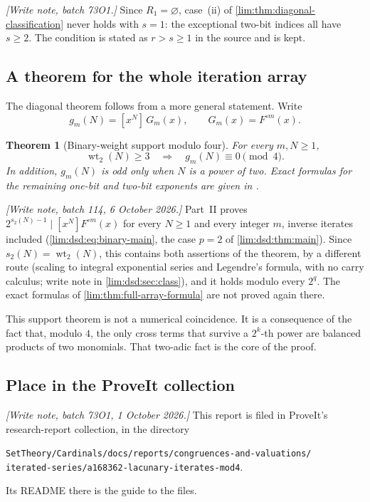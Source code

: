 \documentclass[11pt]{article}
\newtheorem{theorem}{Theorem}[section]
\theoremstyle{definition}
\theoremstyle{remark}
\newcommand{\coef}[2]{[x^{#1}]\,#2}
\newcommand{\wt}{\operatorname{wt}_2}
\begin{document}
\emph{[Write note, batch 73O1.]} Since $R_1=\varnothing$, case~(ii) of
\cref{lim:thm:diagonal-classification} never holds with $s=1$: the
exceptional two-bit indices all have $s\ge2$. The condition is stated as
$r>s\ge1$ in the source and is kept.

\subsection{A theorem for the whole iteration array}

The diagonal theorem follows from a more general statement.  Write
\begin{equation}\label{lim:eq:gmn}
  g_m(N)=\coef{N}{G_m(x)},\qquad G_m(x)=F^{\circ m}(x).
\end{equation}

\begin{theorem}[Binary-weight support modulo four]
\label{lim:thm:whole-array-support}
For every $m,N\ge1$,
\[
  \wt(N)\ge3\quad\Longrightarrow\quad g_m(N)\equiv0\pmod4.
\]
In addition, $g_m(N)$ is odd only when $N$ is a power of two.  Exact formulas
for the remaining one-bit and two-bit exponents are given in
.
\end{theorem}

\emph{[Write note, batch 114, 6 October 2026.]} Part~II proves $2^{s_2(N)-1}\mid[x^N]F^{\circ m}(x)$ for every
$N\ge1$ and every integer $m$, inverse iterates included
(\eqref{lim:dsd:eq:binary-main}, the case $p=2$ of \cref{lim:dsd:thm:main}).
Since $s_2(N)=\wt(N)$, this contains both assertions of the theorem, by a
different route (scaling to integral exponential series and Legendre's
formula, with no carry calculus; write note in \cref{lim:dsd:sec:class}),
and it holds modulo every $2^q$. The exact formulas of
\cref{lim:thm:full-array-formula} are not proved again there.

This support theorem is not a numerical coincidence.  It is a consequence of
the fact that, modulo $4$, the only cross terms that survive a $2^k$-th power
are balanced products of two monomials.  That two-adic fact is the core of the
proof.

\subsection{Place in the ProveIt collection}
\label{lim:sec:collection}

\emph{[Write note, batch 73O1, 1 October 2026.]} This report is filed in
ProveIt's research-report collection, in the directory
\begin{center}\small
\nolinkurl{SetTheory/Cardinals/docs/reports/congruences-and-valuations/}\\
\nolinkurl{iterated-series/a168362-lacunary-iterates-mod4}.
\end{center}
Its README there is the guide to the files.
\end{document}
